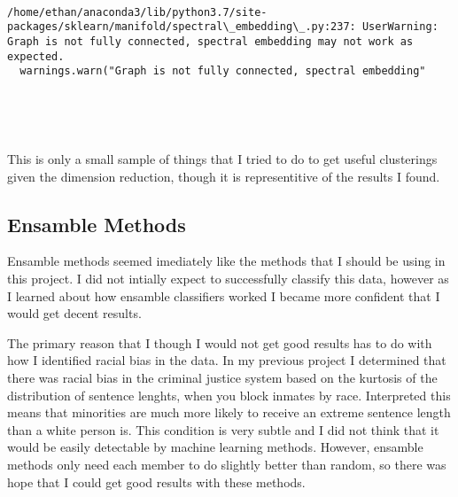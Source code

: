 \documentclass[11pt]{article}
\begin{document}
    \begin{center}
    \end{center}
    { \hspace*{\fill} \\}
    
    \begin{Verbatim}[commandchars=\\\{\}]
/home/ethan/anaconda3/lib/python3.7/site-packages/sklearn/manifold/spectral\_embedding\_.py:237: UserWarning: Graph is not fully connected, spectral embedding may not work as expected.
  warnings.warn("Graph is not fully connected, spectral embedding"

    \end{Verbatim}

    \begin{center}
    \end{center}
    { \hspace*{\fill} \\}
    
    \begin{center}
    \end{center}
    { \hspace*{\fill} \\}
    
    This is only a small sample of things that I tried to do to get useful
clusterings given the dimension reduction, though it is representitive
of the results I found.

    \hypertarget{ensamble-methods}{%
\subsection{Ensamble Methods}\label{ensamble-methods}}

Ensamble methods seemed imediately like the methods that I should be
using in this project. I did not intially expect to successfully
classify this data, however as I learned about how ensamble classifiers
worked I became more confident that I would get decent results.

The primary reason that I though I would not get good results has to do
with how I identified racial bias in the data. In my previous project I
determined that there was racial bias in the criminal justice system
based on the kurtosis of the distribution of sentence lenghts, when you
block inmates by race. Interpreted this means that minorities are much
more likely to receive an extreme sentence length than a white person
is. This condition is very subtle and I did not think that it would be
easily detectable by machine learning methods. However, ensamble methods
only need each member to do slightly better than random, so there was
hope that I could get good results with these methods.
\end{document}
